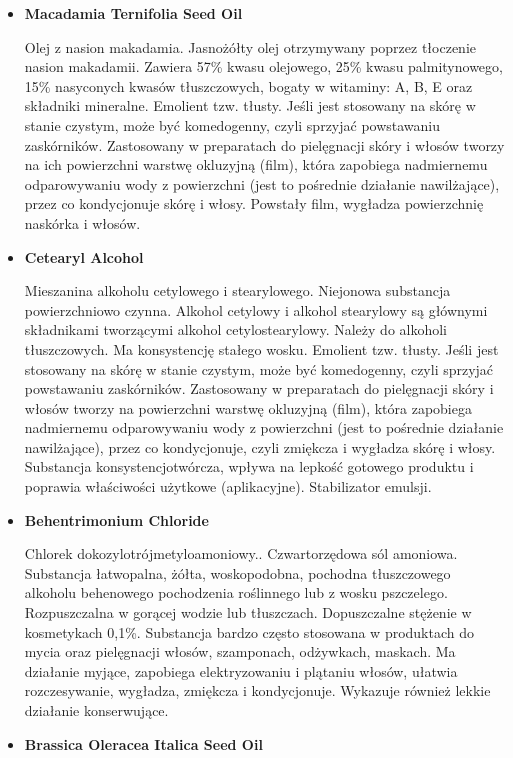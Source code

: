 \begin{itemize}
\item \textbf{Macadamia Ternifolia Seed Oil}

Olej z nasion makadamia. Jasnożółty olej otrzymywany poprzez tłoczenie nasion makadamii. Zawiera 57\% kwasu olejowego, 25\% kwasu palmitynowego, 15\% nasyconych kwasów tłuszczowych, bogaty w witaminy: A, B, E oraz składniki mineralne. Emolient tzw. tłusty. Jeśli jest stosowany na skórę w stanie czystym, może być komedogenny, czyli sprzyjać powstawaniu zaskórników. Zastosowany w preparatach do pielęgnacji skóry i włosów tworzy na ich powierzchni warstwę okluzyjną (film), która zapobiega nadmiernemu odparowywaniu wody z powierzchni (jest to pośrednie działanie nawilżające), przez co kondycjonuje skórę i włosy. Powstały film, wygładza powierzchnię naskórka i włosów.

\item \textbf{Cetearyl Alcohol}

Mieszanina alkoholu cetylowego i stearylowego. Niejonowa substancja powierzchniowo czynna. Alkohol cetylowy i alkohol stearylowy są głównymi składnikami tworzącymi alkohol cetylostearylowy. Należy do alkoholi tłuszczowych. Ma konsystencję stałego wosku. Emolient tzw. tłusty. Jeśli jest stosowany na skórę w stanie czystym, może być komedogenny, czyli sprzyjać powstawaniu zaskórników. Zastosowany w preparatach do pielęgnacji skóry i włosów tworzy na powierzchni warstwę okluzyjną (film), która zapobiega nadmiernemu odparowywaniu wody z powierzchni (jest to pośrednie działanie nawilżające), przez co kondycjonuje, czyli zmiękcza i wygładza skórę i włosy. Substancja konsystencjotwórcza, wpływa na lepkość gotowego produktu i poprawia właściwości użytkowe (aplikacyjne). Stabilizator emulsji.

\item \textbf{Behentrimonium Chloride}

Chlorek dokozylotrójmetyloamoniowy.. Czwartorzędowa sól amoniowa. Substancja łatwopalna, żółta, woskopodobna, pochodna tłuszczowego alkoholu behenowego pochodzenia roślinnego lub z wosku pszczelego. Rozpuszczalna w gorącej wodzie lub tłuszczach. Dopuszczalne stężenie w kosmetykach 0,1\%. Substancja bardzo często stosowana w produktach do mycia oraz pielęgnacji włosów, szamponach, odżywkach, maskach. Ma działanie myjące, zapobiega elektryzowaniu i plątaniu włosów, ułatwia rozczesywanie, wygładza, zmiękcza i kondycjonuje. Wykazuje również lekkie działanie konserwujące.

\item \textbf{Brassica Oleracea Italica Seed Oil}


\end{itemize}
